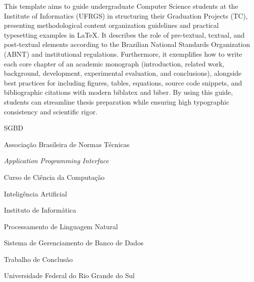 \documentclass[cic,tc,biblatex]{iiufrgs}
\begin{document}
\begin{translatedabstract}
This template aims to guide undergraduate Computer Science students at the Institute of Informatics (UFRGS) in structuring their Graduation Projects (TC), presenting methodological content organization guidelines and practical typesetting examples in \LaTeX. It describes the role of pre-textual, textual, and post-textual elements according to the Brazilian National Standards Organization (ABNT) and institutional regulations. Furthermore, it exemplifies how to write each core chapter of an academic monograph (introduction, related work, background, development, experimental evaluation, and conclusions), alongside best practices for including figures, tables, equations, source code snippets, and bibliographic citations with modern \textsf{biblatex} and \textsf{biber}. By using this guide, students can streamline thesis preparation while ensuring high typographic consistency and scientific rigor.
\end{translatedabstract}

\listoffigures

\listoftables

\begin{listofabbrv}{SGBD}
    \item[ABNT] Associação Brasileira de Normas Técnicas
    \item[API]  \emph{Application Programming Interface}
    \item[CIC]  Curso de Ciência da Computação
    \item[IA]   Inteligência Artificial
    \item[II]   Instituto de Informática
    \item[PLN]  Processamento de Linguagem Natural
    \item[SGBD] Sistema de Gerenciamento de Banco de Dados
    \item[TC]   Trabalho de Conclusão
    \item[UFRGS] Universidade Federal do Rio Grande do Sul
\end{listofabbrv}
\end{document}

